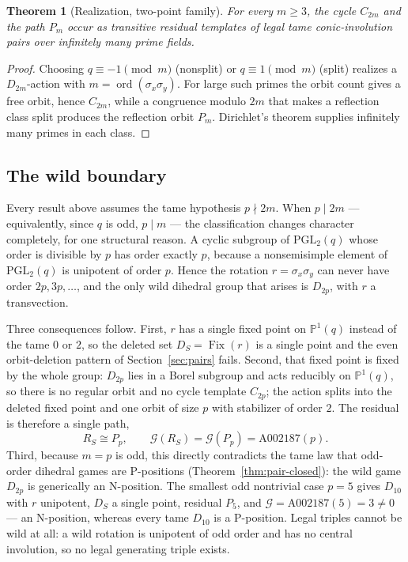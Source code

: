 \documentclass[11pt]{article}
\newtheorem{theorem}{Theorem}[section]
\theoremstyle{definition}
\theoremstyle{remark}
\newcommand{\PGL}{\mathrm{PGL}}
\newcommand{\PP}{\mathbb{P}}
\newcommand{\Grundy}{\mathcal{G}}
\newcommand{\Cyc}{C}
\DeclareMathOperator{\Fix}{Fix}
\DeclareMathOperator{\ord}{ord}
\begin{document}
\begin{theorem}[Realization, two-point family]
\label{thm:realization-pair}
For every $m\ge3$, the cycle $\Cyc_{2m}$ and the path $P_m$ occur as transitive residual templates
of legal tame conic-involution pairs over infinitely many prime fields.
\end{theorem}

\begin{proof}
Choosing $q\equiv-1\pmod m$ (nonsplit) or $q\equiv1\pmod m$ (split) realizes a $D_{2m}$-action with
$m=\ord(\sigma_x\sigma_y)$. For large such primes the orbit count gives a free orbit, hence
$\Cyc_{2m}$, while a congruence modulo $2m$ that makes a reflection class split produces the
reflection orbit $P_m$. Dirichlet's theorem supplies infinitely many primes in each class.
\end{proof}

\subsection{The wild boundary}
\label{subsec:wild}

Every result above assumes the tame hypothesis $p\nmid 2m$. When $p\mid 2m$ --- equivalently, since
$q$ is odd, $p\mid m$ --- the classification changes character completely, for one structural
reason. A cyclic subgroup of $\PGL_2(q)$ whose order is divisible by $p$ has order exactly $p$,
because a nonsemisimple element of $\PGL_2(q)$ is unipotent of order $p$. Hence the rotation
$r=\sigma_x\sigma_y$ can never have order $2p,3p,\dots$, and the only wild dihedral group that
arises is $D_{2p}$, with $r$ a transvection.

Three consequences follow. First, $r$ has a single fixed point on $\PP^1(q)$ instead of the tame $0$
or $2$, so the deleted set $D_S=\Fix(r)$ is a single point and the even orbit-deletion pattern of
Section~\ref{sec:pairs} fails. Second, that fixed point is fixed by the whole group: $D_{2p}$ lies
in a Borel subgroup and acts reducibly on $\PP^1(q)$, so there is no regular orbit and no cycle
template $\Cyc_{2p}$; the action splits into the deleted fixed point and one orbit of size $p$ with
stabilizer of order $2$. The residual is therefore a single path,
\[
  R_S\cong P_p,\qquad \Grundy(R_S)=\Grundy(P_p)=\mathrm{A}002187(p).
\]
Third, because $m=p$ is odd, this directly contradicts the tame law that odd-order dihedral games are
P-positions (Theorem~\ref{thm:pair-closed}): the wild game $D_{2p}$ is generically an N-position. The
smallest odd nontrivial case $p=5$ gives $D_{10}$ with $r$ unipotent, $D_S$ a single point, residual
$P_5$, and $\Grundy=\mathrm{A}002187(5)=3\ne0$ --- an N-position, whereas every tame $D_{10}$ is a
P-position. Legal triples cannot be wild at all: a wild rotation is unipotent of odd order and has
no central involution, so no legal generating triple exists.
\end{document}
